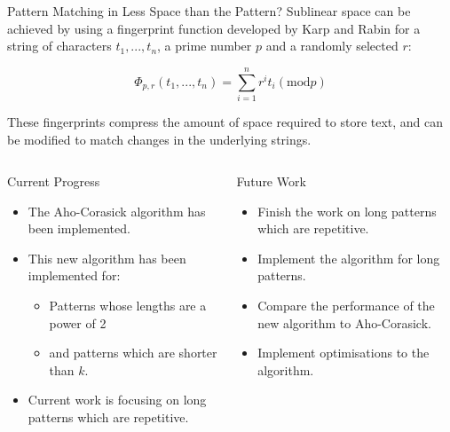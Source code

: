 \documentclass[ %
                    author={Dominic Moylett},
                    degree={MEng},
                     title={Dictionary Matching with Fingerprints},
                  subtitle={},
                      type={Research},
                      year={2015} ]{poster}
\begin{document}
\begin{frame}{}
\begin{columns}[t]
  \begin{column}{0.422\linewidth}
  \begin{block}{\Large Pattern Matching in Less Space than the Pattern?}
  Sublinear space can be achieved by using a fingerprint function developed by Karp and Rabin for a string of characters $t_1,...,t_n$, a prime number $p$ and a randomly selected $r$:

  $$\Phi_{p, r}(t_1,...,t_n) = \sum_{i = 1}^{n}r^it_i (\text{mod} p)$$

  These fingerprints compress the amount of space required to store text, and can be modified to match changes in the underlying strings.
  \end{block}
  \end{column}
\end{columns}

\vfill

\begin{columns}[t]
  \begin{column}{0.422\linewidth}
  \begin{block}{\Large Current Progress}
  \begin{itemize}
  \item The Aho-Corasick algorithm has been implemented.
  \item This new algorithm has been implemented for:
    \begin{itemize}
    \item Patterns whose lengths are a power of 2
    \item and patterns which are shorter than $k$.
    \end{itemize}
  \item Current work is focusing on long patterns which are repetitive.
  \end{itemize}
  \end{block}
  \end{column}
  \begin{column}{0.422\linewidth}
  \begin{block}{\Large Future Work}
  \begin{itemize}
  \item Finish the work on long patterns which are repetitive.
  \item Implement the algorithm for long patterns.
  \item Compare the performance of the new algorithm to Aho-Corasick.
  \item Implement optimisations to the algorithm.
  \end{itemize}
  \end{block}
  \end{column}
\end{columns}

\vfill

\end{frame}

\end{document}
